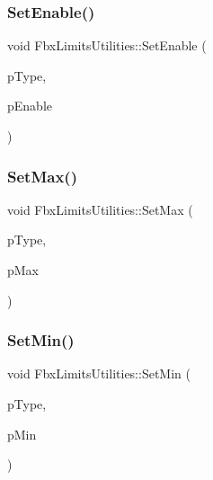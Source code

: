 \mbox{\label{class_fbx_limits_utilities_a304ea11e6242e4212c625843a4ef23f8}} 
\subsubsection{\texorpdfstring{Set\+Enable()}{SetEnable()}}
{\footnotesize\ttfamily void Fbx\+Limits\+Utilities\+::\+Set\+Enable (\begin{DoxyParamCaption}\item[{\hyperlink{class_fbx_limits_utilities_aa55167751039b3d64b56cb7e58f2e62c}{E\+Type}}]{p\+Type,  }\item[{bool}]{p\+Enable }\end{DoxyParamCaption})}

\mbox{\label{class_fbx_limits_utilities_ace31ad7ad7492a26aa4a0d9bc64c369b}} 
\subsubsection{\texorpdfstring{Set\+Max()}{SetMax()}}
{\footnotesize\ttfamily void Fbx\+Limits\+Utilities\+::\+Set\+Max (\begin{DoxyParamCaption}\item[{\hyperlink{class_fbx_limits_utilities_aa55167751039b3d64b56cb7e58f2e62c}{E\+Type}}]{p\+Type,  }\item[{\hyperlink{class_fbx_vector4}{Fbx\+Vector4}}]{p\+Max }\end{DoxyParamCaption})}

\mbox{\label{class_fbx_limits_utilities_a27850a4e588581e0130a2634c518665a}} 
\subsubsection{\texorpdfstring{Set\+Min()}{SetMin()}}
{\footnotesize\ttfamily void Fbx\+Limits\+Utilities\+::\+Set\+Min (\begin{DoxyParamCaption}\item[{\hyperlink{class_fbx_limits_utilities_aa55167751039b3d64b56cb7e58f2e62c}{E\+Type}}]{p\+Type,  }\item[{\hyperlink{class_fbx_vector4}{Fbx\+Vector4}}]{p\+Min }\end{DoxyParamCaption})}

